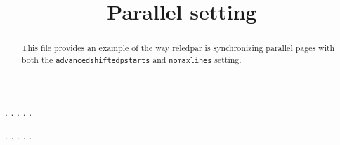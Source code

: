 \documentclass[a5paper,11pt]{article}
\begin{document}
\date{}
\title{Parallel setting}
\maketitle

\begin{abstract}
This file provides an example of the way reledpar is synchronizing parallel pages with both the \verb+advancedshiftedpstarts+ and \verb+nomaxlines+ setting.
\end{abstract}


\begin{pages}
    \begin{Leftside}
        \beginnumbering
            . \blindtext[21]
            \pend{}. \blindtext[10]
            \pend{}. \blindtext[6]
            \pend{}. \blindtext[6]
            \pend
            . \blindtext[6]
            \pend
        \endnumbering
    \end{Leftside}
    \begin{Rightside}
        \beginnumbering
            . \blindtext[22]\footnoteAmk
            \pend{}. \blindtext[12]
            \pend{}. \blindtext[12]
            \pend
            . \blindtext[12]
            \pend
            . \blindtext[12]
            \pend
        \endnumbering
    \end{Rightside}
\end{pages}
\Pages
\end{document}
